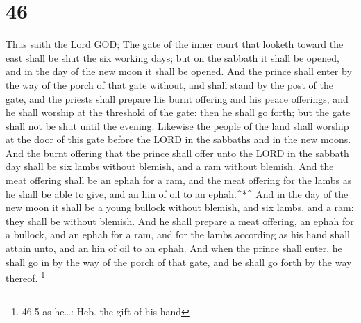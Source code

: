 \hypertarget{section-45}{%
\section{46}\label{section-45}}

 Thus saith the Lord GOD; The gate of the inner court that
looketh toward the east shall be shut the six working days; but on the
sabbath it shall be opened, and in the day of the new moon it shall be
opened.  And the prince shall enter by the way of the porch
of that gate without, and shall stand by the post of the gate, and the
priests shall prepare his burnt offering and his peace offerings, and he
shall worship at the threshold of the gate: then he shall go forth; but
the gate shall not be shut until the evening.  Likewise the
people of the land shall worship at the door of this gate before the
LORD in the sabbaths and in the new moons.  And the burnt
offering that the prince shall offer unto the LORD in the sabbath day
shall be six lambs without blemish, and a ram without blemish.
 And the meat offering shall be an ephah for a ram, and the
meat offering for the lambs as he shall be able to give, and an hin of
oil to an ephah.\^{}*\^{}  And in the day of the new moon it
shall be a young bullock without blemish, and six lambs, and a ram: they
shall be without blemish.  And he shall prepare a meat
offering, an ephah for a bullock, and an ephah for a ram, and for the
lambs according as his hand shall attain unto, and an hin of oil to an
ephah.  And when the prince shall enter, he shall go in by
the way of the porch of that gate, and he shall go forth by the way
thereof. \footnote{46.5 as he\ldots: Heb. the gift of his hand}

